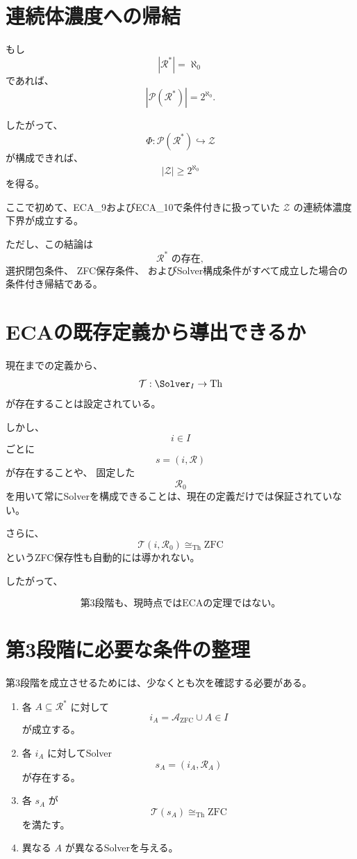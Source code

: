 \documentclass[11pt,a4paper]{article}
\begin{document}
\section{連続体濃度への帰結}

もし
\[
|\mathcal{R}^*|=\aleph_0
\]
であれば、
\[
|\mathcal{P}(\mathcal{R}^*)|
=
2^{\aleph_0}.
\]

したがって、
\[
\Phi:\mathcal{P}(\mathcal{R}^*)\hookrightarrow\mathcal{Z}
\]
が構成できれば、
\[
\boxed{
|\mathcal{Z}|\geq2^{\aleph_0}
}
\]
を得る。

ここで初めて、ECA\_9およびECA\_10で条件付きに扱っていた
$\mathcal{Z}$ の連続体濃度下界が成立する。

ただし、この結論は
\[
\mathcal{R}^*\text{ の存在},
\]
選択閉包条件、
ZFC保存条件、
およびSolver構成条件がすべて成立した場合の条件付き帰結である。

\section{ECAの既存定義から導出できるか}

現在までの定義から、
\[
\mathcal{T}:\Solver_I\to\mathrm{Th}
\]
が存在することは設定されている。

しかし、
\[
i\in I
\]
ごとに
\[
s=(i,\mathcal{R})
\]
が存在することや、
固定した
\[
\mathcal{R}_0
\]
を用いて常にSolverを構成できることは、現在の定義だけでは保証されていない。

さらに、
\[
\mathcal{T}(i,\mathcal{R}_0)
\cong_{\mathrm{Th}}\mathrm{ZFC}
\]
というZFC保存性も自動的には導かれない。

したがって、

\[
\boxed{
\text{第3段階も、現時点ではECAの定理ではない。}
}
\]

\section{第3段階に必要な条件の整理}

第3段階を成立させるためには、少なくとも次を確認する必要がある。

\begin{enumerate}
    \item 各 $A\subseteq\mathcal{R}^*$ に対して
    \[
    i_A=\mathcal{A}_{\mathrm{ZFC}}\cup A\in I
    \]
    が成立する。

    \item 各 $i_A$ に対してSolver
    \[
    s_A=(i_A,\mathcal{R}_A)
    \]
    が存在する。

    \item 各 $s_A$ が
    \[
    \mathcal{T}(s_A)\cong_{\mathrm{Th}}\mathrm{ZFC}
    \]
    を満たす。

    \item 異なる $A$ が異なるSolverを与える。
\end{enumerate}
\end{document}
